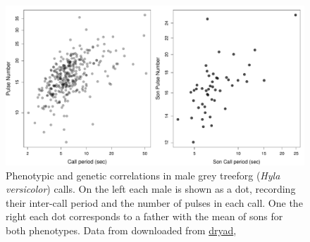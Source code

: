 \begin{figure}
\begin{center}
\includegraphics[width= \textwidth]{Journal_figs/Quant_gen/Frog_calls_Hyla_versicolor/Frog_calls_sibling_means.pdf}
\end{center}
\caption{Phenotypic and genetic correlations in male grey treeforg
  ({\it Hyla versicolor}) calls. On the left each male is shown as a
  dot, recording their inter-call period and the number of pulses in each call. One
  the right each dot corresponds to a father with the mean of sons
  for both phenotypes. Data from \citet{welch2014multivariate} downloaded from
\href{https://datadryad.org/stash/dataset/doi:10.5061/dryad.40sj6}{dryad}, } \label{fig:Frog_genetic_corr}  
\end{figure}


